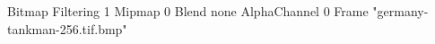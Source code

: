 {Bitmap
	{Filtering 1}
	{Mipmap 0}
	{Blend none}
	{AlphaChannel 0}
	{Frame "germany-tankman-256.tif.bmp"}
}
